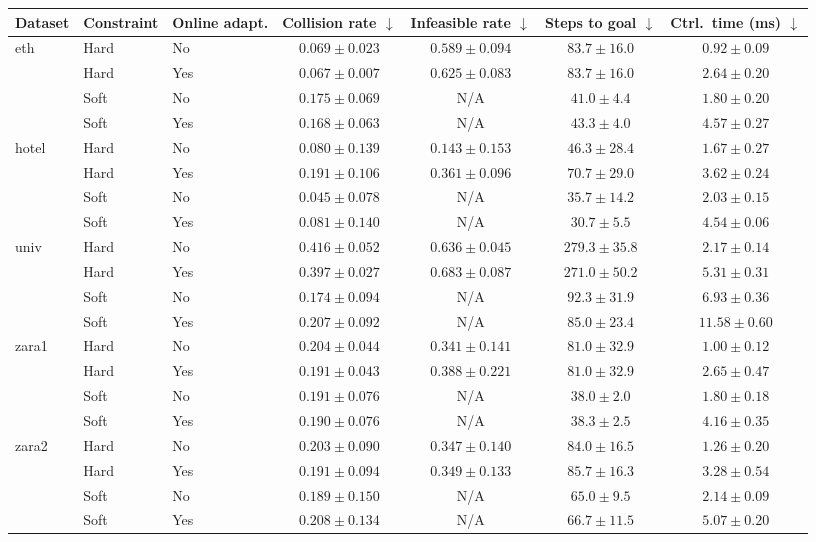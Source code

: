 \begin{tabular}{lllcccc}
\hline
Dataset & Constraint & Online adapt. & Collision rate $\downarrow$ & Infeasible rate $\downarrow$ & Steps to goal $\downarrow$ & Ctrl.\ time (ms) $\downarrow$ \\
\hline
eth & Hard & No & $0.069\pm0.023$ & $\mathbf{0.589}\pm0.094$ & $\mathbf{83.7}\pm16.0$ & $\mathbf{0.92}\pm0.09$ \\
 & Hard & Yes & $\mathbf{0.067}\pm0.007$ & $0.625\pm0.083$ & $\mathbf{83.7}\pm16.0$ & $2.64\pm0.20$ \\
 & Soft & No & $0.175\pm0.069$ & N/A & $\mathbf{41.0}\pm4.4$ & $\mathbf{1.80}\pm0.20$ \\
 & Soft & Yes & $\mathbf{0.168}\pm0.063$ & N/A & $43.3\pm4.0$ & $4.57\pm0.27$ \\
\hline
hotel & Hard & No & $\mathbf{0.080}\pm0.139$ & $\mathbf{0.143}\pm0.153$ & $\mathbf{46.3}\pm28.4$ & $\mathbf{1.67}\pm0.27$ \\
 & Hard & Yes & $0.191\pm0.106$ & $0.361\pm0.096$ & $70.7\pm29.0$ & $3.62\pm0.24$ \\
 & Soft & No & $\mathbf{0.045}\pm0.078$ & N/A & $35.7\pm14.2$ & $\mathbf{2.03}\pm0.15$ \\
 & Soft & Yes & $0.081\pm0.140$ & N/A & $\mathbf{30.7}\pm5.5$ & $4.54\pm0.06$ \\
\hline
univ & Hard & No & $0.416\pm0.052$ & $\mathbf{0.636}\pm0.045$ & $279.3\pm35.8$ & $\mathbf{2.17}\pm0.14$ \\
 & Hard & Yes & $\mathbf{0.397}\pm0.027$ & $0.683\pm0.087$ & $\mathbf{271.0}\pm50.2$ & $5.31\pm0.31$ \\
 & Soft & No & $\mathbf{0.174}\pm0.094$ & N/A & $92.3\pm31.9$ & $\mathbf{6.93}\pm0.36$ \\
 & Soft & Yes & $0.207\pm0.092$ & N/A & $\mathbf{85.0}\pm23.4$ & $11.58\pm0.60$ \\
\hline
zara1 & Hard & No & $0.204\pm0.044$ & $\mathbf{0.341}\pm0.141$ & $\mathbf{81.0}\pm32.9$ & $\mathbf{1.00}\pm0.12$ \\
 & Hard & Yes & $\mathbf{0.191}\pm0.043$ & $0.388\pm0.221$ & $\mathbf{81.0}\pm32.9$ & $2.65\pm0.47$ \\
 & Soft & No & $0.191\pm0.076$ & N/A & $\mathbf{38.0}\pm2.0$ & $\mathbf{1.80}\pm0.18$ \\
 & Soft & Yes & $\mathbf{0.190}\pm0.076$ & N/A & $38.3\pm2.5$ & $4.16\pm0.35$ \\
\hline
zara2 & Hard & No & $0.203\pm0.090$ & $\mathbf{0.347}\pm0.140$ & $\mathbf{84.0}\pm16.5$ & $\mathbf{1.26}\pm0.20$ \\
 & Hard & Yes & $\mathbf{0.191}\pm0.094$ & $0.349\pm0.133$ & $85.7\pm16.3$ & $3.28\pm0.54$ \\
 & Soft & No & $\mathbf{0.189}\pm0.150$ & N/A & $\mathbf{65.0}\pm9.5$ & $\mathbf{2.14}\pm0.09$ \\
 & Soft & Yes & $0.208\pm0.134$ & N/A & $66.7\pm11.5$ & $5.07\pm0.20$ \\
\hline
\end{tabular}